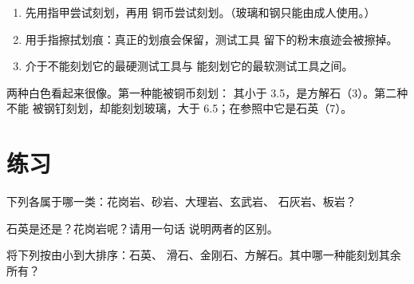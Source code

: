 \begin{method}[划痕测试]\label{met:g6:rocks-and-minerals:scratch}
\begin{enumerate}
  \item 先用指甲尝试刻划，再用
        铜币尝试刻划。（玻璃和钢只能由成人使用。）
  \item 用手指擦拭划痕：真正的划痕会保留，测试工具
        留下的粉末痕迹会被擦掉。
  \item {}介于不能刻划它的最硬测试工具与
        能刻划它的最软测试工具之间。
\end{enumerate}
\end{method}

\begin{example}[石英还是方解石？]\label{ex:g6:rocks-and-minerals:quartz-calcite}
两种白色看起来很像。第一种能被铜币刻划：
其小于 3.5，是方解石（3）。第二种不能
被钢钉刻划，却能刻划玻璃，大于
6.5；在参照中它是石英（7）。
\end{example}

\section{练习}

\begin{exercise}[$\star$]\label{exo:g6:rocks-and-minerals:1}
下列各属于哪一类：花岗岩、砂岩、大理岩、玄武岩、
石灰岩、板岩？
\end{exercise}

\begin{exercise}[$\star$]\label{exo:g6:rocks-and-minerals:2}
石英是还是？花岗岩呢？请用一句话
说明两者的区别。
\end{exercise}

\begin{exercise}[$\star$]\label{exo:g6:rocks-and-minerals:3}
将下列按由小到大排序：石英、
滑石、金刚石、方解石。其中哪一种能刻划其余所有？
\end{exercise}

